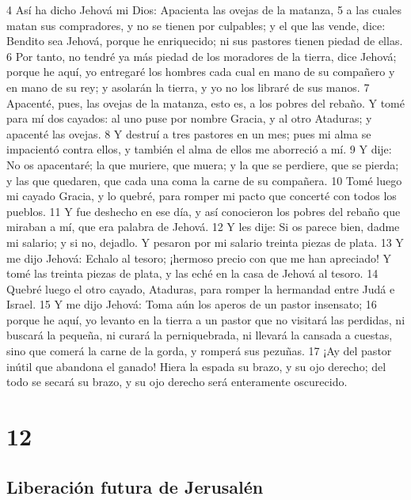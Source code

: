 4 Así ha dicho Jehová mi Dios: Apacienta las ovejas de la matanza,
5 a las cuales matan sus compradores, y no se tienen por culpables; y el que las vende, dice: Bendito sea Jehová, porque he enriquecido; ni sus pastores tienen piedad de ellas.
6 Por tanto, no tendré ya más piedad de los moradores de la tierra, dice Jehová; porque he aquí, yo entregaré los hombres cada cual en mano de su compañero y en mano de su rey; y asolarán la tierra, y yo no los libraré de sus manos.
7 Apacenté, pues, las ovejas de la matanza, esto es, a los pobres del rebaño. Y tomé para mí dos cayados: al uno puse por nombre Gracia, y al otro Ataduras; y apacenté las ovejas.
8 Y destruí a tres pastores en un mes; pues mi alma se impacientó contra ellos, y también el alma de ellos me aborreció a mí.
9 Y dije: No os apacentaré; la que muriere, que muera; y la que se perdiere, que se pierda; y las que quedaren, que cada una coma la carne de su compañera.
10 Tomé luego mi cayado Gracia, y lo quebré, para romper mi pacto que concerté con todos los pueblos.
11 Y fue deshecho en ese día, y así conocieron los pobres del rebaño que miraban a mí, que era palabra de Jehová.
12 Y les dije: Si os parece bien, dadme mi salario; y si no, dejadlo. Y pesaron por mi salario treinta piezas de plata.
13 Y me dijo Jehová: Echalo al tesoro; ¡hermoso precio con que me han apreciado! Y tomé las treinta piezas de plata, y las eché en la casa de Jehová al tesoro. 
14 Quebré luego el otro cayado, Ataduras, para romper la hermandad entre Judá e Israel.
15 Y me dijo Jehová: Toma aún los aperos de un pastor insensato;
16 porque he aquí, yo levanto en la tierra a un pastor que no visitará las perdidas, ni buscará la pequeña, ni curará la perniquebrada, ni llevará la cansada a cuestas, sino que comerá la carne de la gorda, y romperá sus pezuñas.
17 ¡Ay del pastor inútil que abandona el ganado! Hiera la espada su brazo, y su ojo derecho; del todo se secará su brazo, y su ojo derecho será enteramente oscurecido.

\chapter{12}

\section*{Liberación futura de Jerusalén}

